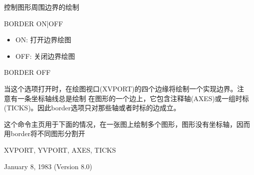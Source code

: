 \label{cmd:border}

控制图形周围边界的绘制

BORDER {ON|OFF}

\begin{itemize}
\item ON: 打开边界绘图
\item OFF: 关闭边界绘图 
\end{itemize}

BORDER OFF

当这个选项打开时，在绘图视口(XVPORT)的四个边缘将绘制一个实现边界。注意有一条坐标轴线总是绘制
在图形的一个边上，它包含注释轴(AXES)或一组时标(TICKS)。因此border选项只对那些轴或者时标的边成立。

这个命令主页用于下面的情况，在一张图上绘制多个图形，图形没有坐标轴，因而用border将不同图形分割开

XVPORT, YVPORT, AXES, TICKS

January 8, 1983 (Version 8.0)
